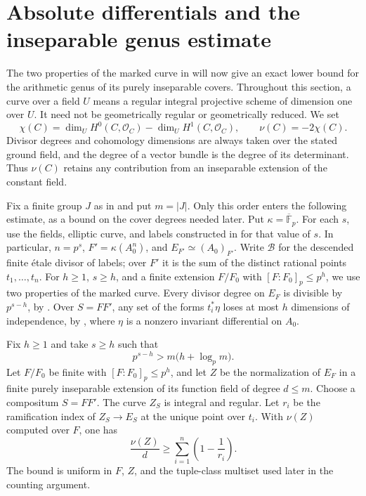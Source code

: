\section{Absolute differentials and the inseparable genus estimate}
\label{sec:differentials}

The two properties of the marked curve in  will now
give an exact lower bound for the arithmetic genus of its purely
inseparable covers. Throughout this section, a curve over a field $U$
means a regular integral projective scheme of dimension one over $U$.
It need not be geometrically regular or geometrically reduced. We set
\[
 \chi(C)=\dim_U H^0(C,\mathcal O_C)-\dim_U H^1(C,\mathcal O_C),
 \qquad \nu(C)=-2\chi(C).
\]
Divisor degrees and cohomology dimensions are always taken over the
stated ground field, and the degree of a vector bundle is the degree
of its determinant. Thus $\nu(C)$ retains any contribution from an
inseparable extension of the constant field.

Fix a finite group $J$ as in  and put
$m=|J|$. Only this order enters the following estimate, as a bound on
the cover degrees needed later.
Put $\kappa=\overline{\mathbb F}_p$. For each $s$, use the fields,
elliptic curve, and labels constructed in  for
that value of $s$. In particular,
$n=p^s$, $F'=\kappa(A_0^n)$, and $E_{F'}\simeq(A_0)_{F'}$.
Write $\mathcal B$ for the descended finite \'{e}tale divisor of labels;
over $F'$ it is the sum of the distinct rational points $t_1,\ldots,t_n$.
For $h\geq1$, $s\geq h$, and a finite extension $F/F_0$ with
$[F:F_0]_p\leq p^h$, we use two properties of the marked curve.
Every divisor degree on $E_F$ is divisible by $p^{s-h}$, by
. Over $S=FF'$, any set of the forms
$t_i^*\eta$ loses at most $h$ dimensions of independence, by
, where $\eta$ is a nonzero invariant differential
on $A_0$.

\begin{theorem}
\label{thm:inseparable-genus}
Fix $h\ge1$ and take $s\ge h$ such that
\begin{equation}
 p^{s-h}>m\bigl(h+\log_p m\bigr).
 \label{eq:genus-rounding-threshold}
\end{equation}
Let $F/F_0$ be finite with $[F:F_0]_p\le p^h$, and let $Z$ be the
normalization of $E_F$ in a finite purely inseparable extension of its
function field of degree $d\le m$.  Choose a compositum $S=FF'$.
The curve $Z_S$ is integral and regular.  Let $r_i$ be the ramification
index of $Z_S\to E_S$ at the unique point over $t_i$.
With $\nu(Z)$ computed over $F$, one has
\begin{equation}
 \frac{\nu(Z)}d\ge\sum_{i=1}^n\left(1-\frac1{r_i}\right).
 \label{eq:inseparable-genus-bound}
\end{equation}
The bound is uniform in $F$, $Z$, and the tuple-class multiset used
later in the counting argument.
\end{theorem}

